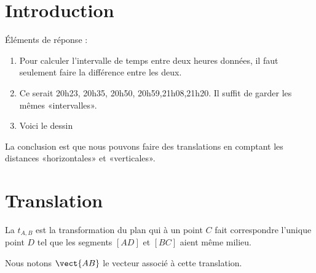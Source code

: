 

\section*{Introduction}



\clearpage

Éléments de réponse :
\begin{enumerate}
    \item
        Pour calculer l'intervalle de temps entre deux heures données, il faut seulement faire la différence entre les deux.
        \begin{center}
           
        \end{center}
    \item
        Ce serait 20h23, 20h35, 20h50, 20h59,21h08,21h20. Il suffit de garder les mêmes «intervalles».
    \item
        Voici le dessin
        \begin{center}
           
        \end{center}
\end{enumerate}
La conclusion est que nous pouvons faire des translations en comptant les distances «horizontales» et «verticales».

\section{Translation}

\begin{definition}  
    La  \( t_{A,B}\) est la transformation du plan qui à un point \( C\) fait correspondre l'unique point \( D\) tel que les segments \( [AD]\) et \( [BC]\) aient même milieu.

Nous notons \( \vect{ AB }\) le vecteur associé à cette translation.
\end{definition}


